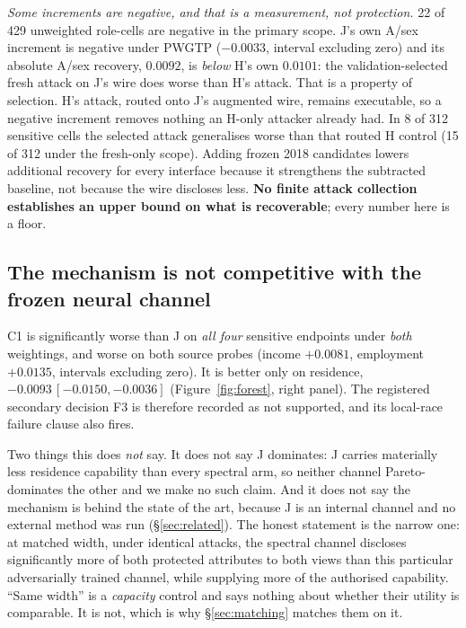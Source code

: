 \documentclass[10pt]{article}
\begin{document}
\emph{Some increments are negative, and that is a measurement, not protection.} 22 of 429 unweighted
role-cells are negative in the primary scope. J's own A/sex increment is negative under PWGTP
($-0.0033$, interval excluding zero) and its absolute A/sex recovery, $0.0092$, is \emph{below} H's
own $0.0101$: the validation-selected fresh attack on J's wire does worse than H's attack. That is a
property of selection. H's attack, routed onto J's augmented wire, remains executable, so a negative
increment removes nothing an H-only attacker already had. In 8 of 312 sensitive cells the selected
attack generalises worse than that routed H control (15 of 312 under the fresh-only scope). Adding
frozen 2018 candidates lowers additional recovery for every interface because it strengthens the
subtracted baseline, not because the wire discloses less. \textbf{No finite attack collection
establishes an upper bound on what is recoverable}; every number here is a floor.

\subsection{The mechanism is not competitive with the frozen neural channel}
\label{sec:notcompetitive}

C1 is significantly worse than J on \emph{all four} sensitive endpoints under \emph{both}
weightings, and worse on both source probes (income $+0.0081$, employment $+0.0135$, intervals
excluding zero). It is better only on residence, $-0.0093\,[-0.0150,-0.0036]$
(Figure~\ref{fig:forest}, right panel). The registered secondary decision F3 is therefore recorded
as not supported, and its local-race failure clause also fires.

Two things this does \emph{not} say. It does not say J dominates: J carries materially less
residence capability than every spectral arm, so neither channel Pareto-dominates the other and we
make no such claim. And it does not say the mechanism is behind the state of the art, because J is
an internal channel and no external method was run (\S\ref{sec:related}). The honest statement is
the narrow one: at matched width, under identical attacks, the spectral channel discloses
significantly more of both protected attributes to both views than this particular adversarially
trained channel, while supplying more of the authorised capability. ``Same width'' is a
\emph{capacity} control and says nothing about whether their utility is comparable. It is not,
which is why \S\ref{sec:matching} matches them on it.
\end{document}
